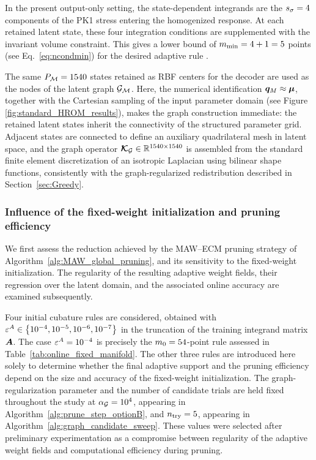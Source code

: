 \documentclass[preprint,10pt]{elsarticle}  %
\begin{document}
In the present output-only setting, the state-dependent integrands are
the $s_{\sigma} =4$ components of the   PK1 stress entering the
homogenized response. At each retained latent state, these four
integration conditions are supplemented with the invariant volume
constraint. This gives    a lower bound of $m_{\textrm{min}} = 4+1 = 5$ points (see Eq.~\ref{eq:ncondmin}) for the desired
  adaptive rule .

The same \(P_{\mathcal{M}}=1540\) states retained as RBF centers for the decoder are used as the
nodes of the latent graph \(\mathcal{G}_{\mathcal{M}}\). Here, the numerical identification
\(\bm{q}_M\approx\bm{\mu}\), together with the Cartesian sampling of the input
parameter domain (see Figure \ref{fig:standard_HROM_results}), makes the graph construction immediate: the retained
latent states inherit the connectivity of the structured parameter
grid. Adjacent states are connected to define an auxiliary
quadrilateral mesh in latent space, and the graph operator \(\boldsymbol{\mathcal{K}}_{\mathcal{G}} \in \mathbb{R}^{1540 \times 1540}\) is
assembled from the standard finite element discretization of an
isotropic Laplacian using bilinear shape functions, consistently with
the graph-regularized redistribution described in
Section~\ref{sec:Greedy}.

\subsubsection{Influence of the fixed-weight initialization and pruning
efficiency}
\label{sec:infl_fw_ini}

We first assess the reduction achieved by the MAW--ECM pruning strategy
of Algorithm~\ref{alg:MAW_global_pruning}, and its sensitivity to the
fixed-weight initialization. The regularity of the resulting adaptive
weight fields, their regression over the latent domain, and the
associated online accuracy are examined subsequently.

Four initial cubature rules are considered, obtained with $\varepsilon^A\in
\left\{10^{-4},10^{-5},10^{-6},10^{-7}\right\}$
in the truncation of the training integrand matrix \(\bm{A}\). The case
\(\varepsilon^A=10^{-4}\) is precisely the \(m_0=54\)-point rule
assessed in Table~\ref{tab:online_fixed_manifold}. The other three rules
are introduced here solely to determine whether the final adaptive
support and the pruning efficiency depend   on the size and
accuracy of the fixed-weight initialization.  The graph-regularization parameter and the number of candidate trials
are held fixed throughout the study at
\(\alpha_{\mathcal{G}}=10^4\), appearing in
Algorithm~\ref{alg:prune_step_optionB}, and
\(n_{\mathrm{try}}=5\), appearing in
Algorithm~\ref{alg:graph_candidate_sweep}. These values were selected
after preliminary experimentation as a compromise between regularity of
the adaptive weight fields and computational efficiency during pruning.
\end{document}
